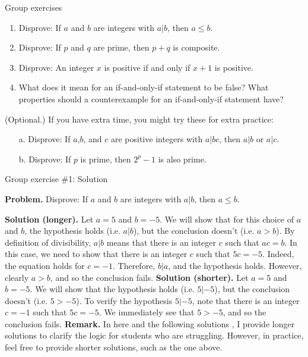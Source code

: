 \documentclass[10pt]{beamer}
\begin{document}
\begin{frame}{Group exercises}
\begin{enumerate}
	\item Disprove: If $a$ and $b$ are integers with $a|b$, then $a \leq b$.
	\item Disprove: If $p$ and $q$ are prime, then $p+q$ is composite.
	\item Disprove: An integer $x$ is positive if and only if $x+1$ is positive.
	\item What does it mean for an if-and-only-if statement to be false? What properties should a counterexample for an if-and-only-if statement have?
\end{enumerate}

\vfill  \vfill 
(Optional.) If you have extra time, you might try these for extra practice:
\vspace{-0.5cm}
\begin{enumerate}
	\item[a.] Disprove: If $a$,$b$, and $c$ are positive integers with $a|bc$, then $a|b$ or $a|c$.
	\item[b.] Disprove: If $p$ is prime, then $2^p-1$ is also prime.
\end{enumerate}

\end{frame}


\begin{frame}{Group exercise \#1: Solution}

\textbf{Problem.} Disprove: If $a$ and $b$ are integers with $a|b$, then $a \leq b$.
\vfill 

\textbf{Solution (longer).} Let $a=5$ and $b=-5$. We will show that for this choice of $a$ and $b$, the hypothesis holds (i.e. $a|b$), but the conclusion doesn't (i.e. $a>b$).  By definition of divisibility, $a|b$ means that there is an integer $c$ such that $ac =b$. In this case, we need to show that there is an integer $c$ such that  $5c=-5$.  Indeed, the equation holds for $c=-1$.  Therefore, $b|a$, and the hypothesis holds.  However, clearly $a>b$, and so the conclusion fails. 
\vfill 
\textbf{Solution (shorter).} Let $a=5$ and $b=-5$. We will show that the hypothesis holds (i.e. $5|-5$), but the conclusion doesn't (i.e. $5>-5$).  To verify the hypothesis $5|-5$, note that there is an integer $c=-1$ such that  $5c=-5$.  We immediately see that $5>-5$, and so the conclusion fails.
\vfill 
\textbf{Remark.} In here and the following solutions , I provide longer solutions to clarify the logic for students who are struggling. However, in practice, feel free to provide shorter solutions, such as the one above.
\end{frame}
\end{document}
